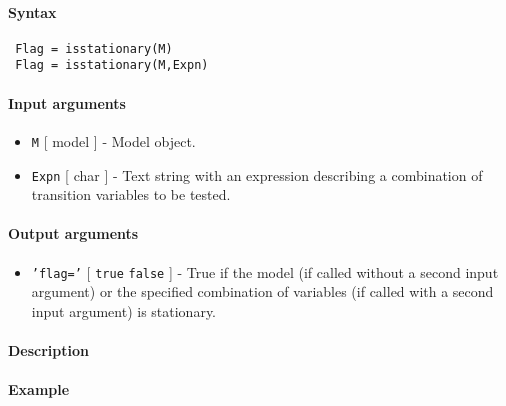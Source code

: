 


	\paragraph{Syntax}
 
 \begin{verbatim}
 Flag = isstationary(M)
 Flag = isstationary(M,Expn)
 \end{verbatim}
 
 \paragraph{Input arguments}
 
 \begin{itemize}
 \item
   \texttt{M} {[} model {]} - Model object.
 \item
   \texttt{Expn} {[} char {]} - Text string with an expression describing
   a combination of transition variables to be tested.
 \end{itemize}
 
 \paragraph{Output arguments}
 
 \begin{itemize}
 \item
   \texttt{'flag='} {[} \texttt{true} \textbar{} \texttt{false} {]} -
   True if the model (if called without a second input argument) or the
   specified combination of variables (if called with a second input
   argument) is stationary.
 \end{itemize}
 
 \paragraph{Description}
 
 \paragraph{Example}


